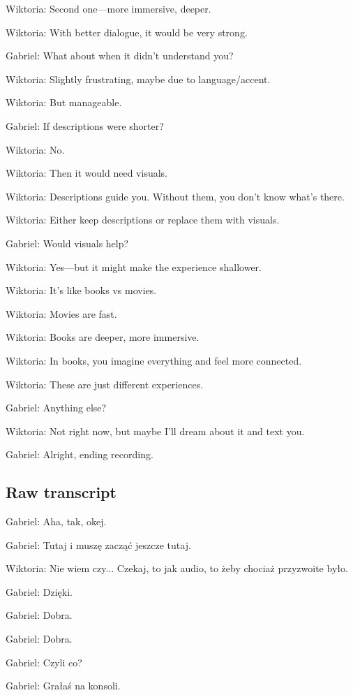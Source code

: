 Wiktoria: Second one—more immersive, deeper.

Wiktoria: With better dialogue, it would be very strong.

Gabriel: What about when it didn’t understand you?

Wiktoria: Slightly frustrating, maybe due to language/accent.

Wiktoria: But manageable.

Gabriel: If descriptions were shorter?

Wiktoria: No.

Wiktoria: Then it would need visuals.

Wiktoria: Descriptions guide you. Without them, you don’t know what’s there.

Wiktoria: Either keep descriptions or replace them with visuals.

Gabriel: Would visuals help?

Wiktoria: Yes—but it might make the experience shallower.

Wiktoria: It’s like books vs movies.

Wiktoria: Movies are fast.

Wiktoria: Books are deeper, more immersive.

Wiktoria: In books, you imagine everything and feel more connected.

Wiktoria: These are just different experiences.

Gabriel: Anything else?

Wiktoria: Not right now, but maybe I’ll dream about it and text you.

Gabriel: Alright, ending recording.





\subsection{Raw transcript}

Gabriel: Aha, tak, okej.

Gabriel: Tutaj i muszę zacząć jeszcze tutaj.

Wiktoria: Nie wiem czy... Czekaj, to jak audio, to żeby chociaż przyzwoite było.

Gabriel: Dzięki.

Gabriel: Dobra.

Gabriel: Dobra.

Gabriel: Czyli co?

Gabriel: Grałaś na konsoli.

